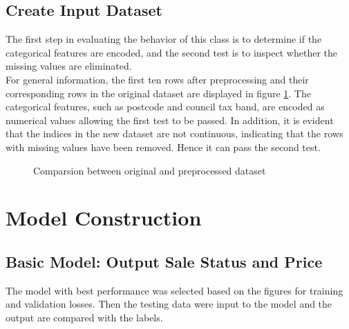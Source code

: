\documentclass[12pt,twoside]{report}
\begin{document}
\subsection{Create Input Dataset}
The first step in evaluating the behavior of this class is to determine if the categorical features are encoded, and the second test is to inspect whether the missing values are eliminated.
\\

For general information, the first ten rows after preprocessing and their corresponding rows in the original dataset are displayed in figure \ref{general_info}. The categorical features, such as postcode and council tax band, are encoded as numerical values allowing the first test to be passed. In addition, it is evident that the indices in the new dataset are not continuous, indicating that the rows with missing values have been removed. Hence it can pass the second test. 

\begin{figure}[h]
	\centering
	\caption{Comparsion between original and preprocessed dataset}
	\label{general_info}
\end{figure}

\section{Model Construction}
\subsection{Basic Model: Output Sale Status and Price}
The model with best performance was selected based on the figures for training and validation losses. Then the testing data were input to the model and the output are compared with the labels. 
\\
\end{document}
